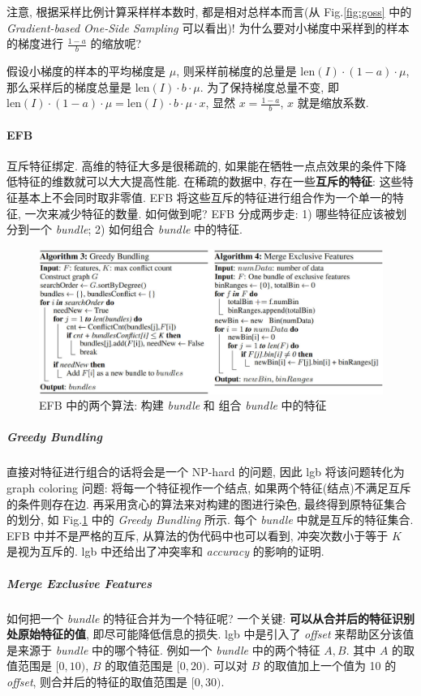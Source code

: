 注意, 根据采样比例计算采样样本数时, 都是相对总样本而言(从 Fig.\ref{fig:goss} 中的 \textit{Gradient-based One-Side Sampling} 可以看出)! 为什么要对小梯度中采样到的样本的梯度进行 $\frac{1 - a}{b}$ 的缩放呢? 

假设小梯度的样本的平均梯度是 $\mu$, 则采样前梯度的总量是 $\text{len}(I) \cdot (1-a) \cdot \mu$, 那么采样后的梯度总量是 $\text{len}(I) \cdot b \cdot \mu$. 为了保持梯度总量不变, 即 $\text{len}(I) \cdot (1-a) \cdot \mu = \text{len}(I) \cdot b \cdot \mu \cdot x$, 显然 $x = \frac{1 - a}{b}$, $x$ 就是缩放系数.

\paragraph{EFB}
互斥特征绑定. 高维的特征大多是很稀疏的, 如果能在牺牲一点点效果的条件下降低特征的维数就可以大大提高性能. 在稀疏的数据中, 存在一些\textbf{互斥的特征}: 这些特征基本上不会同时取非零值. EFB 将这些互斥的特征进行组合作为一个单一的特征, 一次来减少特征的数量. 如何做到呢? EFB 分成两步走: 1) 哪些特征应该被划分到一个 \textit{bundle}; 2) 如何组合 \textit{bundle} 中的特征.

\begin{figure}[h]
	\centering
	\includegraphics[width=\textwidth]{pics/efb.jpg}
	\caption{EFB 中的两个算法: 构建 \textit{bundle} 和 组合 \textit{bundle} 中的特征}
	\label{fig:efb}
\end{figure}

\subparagraph{Greedy Bundling}
直接对特征进行组合的话将会是一个 NP-hard 的问题, 因此 lgb 将该问题转化为 graph coloring 问题: 将每一个特征视作一个结点, 如果两个特征(结点)不满足互斥的条件则存在边. 再采用贪心的算法来对构建的图进行染色, 最终得到原特征集合的划分, 如 Fig.\ref{fig:efb} 中的 \textit{Greedy Bundling} 所示. 每个 \textit{bundle} 中就是互斥的特征集合. EFB 中并不是严格的互斥, 从算法的伪代码中也可以看到, 冲突次数小于等于 $K$ 是视为互斥的. lgb 中还给出了冲突率和 \textit{accuracy} 的影响的证明. 

\subparagraph{Merge Exclusive Features}
如何把一个 \textit{bundle} 的特征合并为一个特征呢? 一个关键: \textbf{可以从合并后的特征识别处原始特征的值}, 即尽可能降低信息的损失. lgb 中是引入了 \textit{offset} 来帮助区分该值是来源于 \textit{bundle} 中的哪个特征. 例如一个 \textit{bundle} 中的两个特征 $A, B$. 其中 $A$ 的取值范围是 $[0, 10)$, $B$ 的取值范围是 $[0, 20)$. 可以对 $B$ 的取值加上一个值为 10 的 \textit{offset}, 则合并后的特征的取值范围是 $[0, 30)$. 


